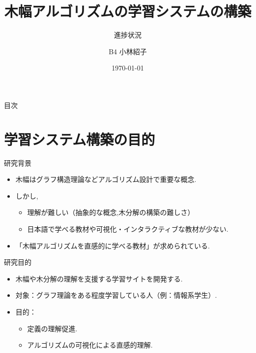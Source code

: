 \documentclass[aspectratio=169]{beamer}
\begin{document}
\title{\Large 木幅アルゴリズムの学習システムの構築}
\subtitle{進捗状況} 
\author{\small B4 小林紹子} %
\date{\small\today} %

\begin{frame}
    \titlepage
\end{frame}

\begin{frame}{目次}
    \tableofcontents
\end{frame}

\section{学習システム構築の目的}

\begin{frame}{研究背景}
    \begin{itemize}
        \setlength{\parskip}{1.5em}
        \item 木幅はグラフ構造理論などアルゴリズム設計で重要な概念.
        \item しかし,
        \begin{itemize}
            \setlength{\parskip}{1em}
            \item 理解が難しい（抽象的な概念,木分解の構築の難しさ）
            \item 日本語で学べる教材や可視化・インタラクティブな教材が少ない.
        \end{itemize}
        \item \Rightarrow 「木幅アルゴリズムを直感的に学べる教材」が求められている.
    \end{itemize}
\end{frame}

\begin{frame}{研究目的}
    \begin{itemize}
        \setlength{\parskip}{1.5em}
        \item 木幅や木分解の理解を支援する学習サイトを開発する.
        \item 対象：グラフ理論をある程度学習している人（例：情報系学生）.
        \item 目的：
        \begin{itemize}
            \setlength{\parskip}{1.5em}
            \item 定義の理解促進.
            \item アルゴリズムの可視化による直感的理解.
        \end{itemize}
    \end{itemize}
\end{frame}
\end{document}
